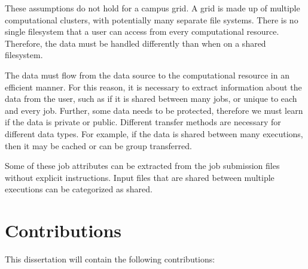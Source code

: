 These assumptions do not hold for a campus grid.  A grid is made up of multiple computational clusters, with potentially many separate file systems.  There is no single filesystem that a user can access from every computational resource.  Therefore, the data must be handled differently than when on a shared filesystem.  

The data must flow from the data source to the computational resource in an efficient manner.  For this reason, it is necessary to extract information about the data from the user, such as if it is shared between many jobs, or unique to each and every job.  Further, some data needs to be protected, therefore we must learn if the data is private or public.  Different transfer methods are necessary for different data types.  For example, if the data is shared between many executions, then it may be cached or can be group transferred.  

Some of these job attributes can be extracted from the job submission files without explicit instructions.  Input files that are shared between multiple executions can be categorized as shared.

\section{Contributions}

This dissertation will contain the following contributions:

